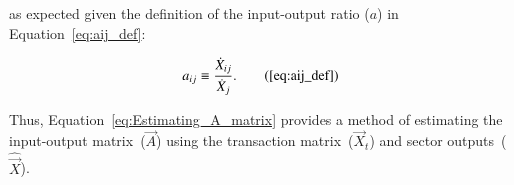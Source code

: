 \noindent{}as expected
given the definition of the input-output ratio ($a$) 
in Equation~\ref{eq:aij_def}:

\begin{equation}
	a_{ij} 
	\equiv \frac{\dot{X}_{ij}}{\dot{X}_{j}}.\tag{\ref{eq:aij_def}}
\end{equation}

Thus, Equation~\ref{eq:Estimating_A_matrix} provides a method 
of estimating the input-output matrix~($\vec{A}$) using
the transaction matrix~($\vec{X}_{t}$)
and sector outputs~($\hat{\vec{X}}$).



%
%
%
%
%
